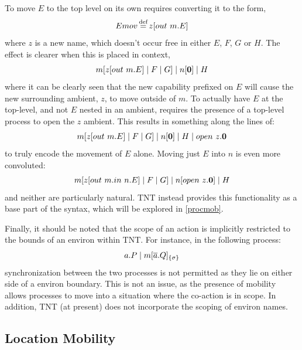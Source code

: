 To move $E$ to the top level on its own requires converting it to the
form,
\begin{equation}
Emov \operatorname{\stackrel{\textrm{def}}{=}} z[out\ m.E]
\end{equation}
where $z$ is a new name, which doesn't occur free in either
$E$, $F$, $G$ or $H$.  The effect is clearer when this is placed in
context,
\begin{equation}
m[z[out\ m.E]\;|\;F\;|\;G]\;|\;n[\textbf{0}]\;|\;H
\end{equation}
where it can be clearly seen that the new capability prefixed
on $E$ will cause the new surrounding ambient, $z$, to move outside of
$m$.  To actually have $E$ at the top-level, and not $E$ nested in an
ambient, requires the presence of a top-level process to open the $z$
ambient.  This results in something along the lines of:
\begin{equation}
m[z[out\ m.E]\;|\;F\;|\;G]\;|\;n[\textbf{0}]\;|\;H\;|\;open\ z.\textbf{0}
\end{equation}
to truly encode the movement of $E$ alone.  Moving just $E$
into $n$ is even more convoluted:
\begin{equation}
m[z[out\ m.in\ n.E]\;|\;F\;|\;G]\;|\;n[open\ z.\textbf{0}]\;|\;H
\end{equation}
and neither are particularly natural.  TNT instead provides
this functionality as a base part of the syntax, which will be explored
in \ref{procmob}.  

Finally, it should be noted that the scope of an action is implicitly
restricted to the bounds of an environ within TNT.  For instance, in the
following process:
\begin{equation}
a.P \;|\; {m}[ \overline{a}.Q ]_{\{\sigma\}}
\end{equation}
synchronization between the two processes is not permitted as
they lie on either side of a environ boundary.  This is not an issue,
as the presence of mobility allows processes to move into a situation
where the co-action is in scope.  In addition, TNT (at present) does not
incorporate the scoping of environ names.

\subsection{Location Mobility}
\label{locmob}

